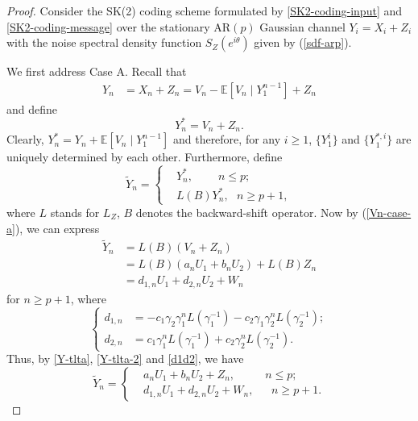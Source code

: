 \documentclass[12pt]{article}
\newcommand{\E}{\mathbb{E}}
\begin{document}
\begin{proof}
Consider the SK(2) coding scheme formulated by \eqref{SK2-coding-input} and \eqref{SK2-coding-message} over the stationary AR$(p)$ Gaussian channel $Y_i = X_i +Z_i$ with the noise spectral density function $S_Z(e^{i\theta})$ given by (\ref{sdf-arp}).

We first address Case A. Recall that 
\begin{equation*}
\begin{aligned}
Y_n &= X_n + Z_n= V_n -\E[V_n\mid Y_1^{n-1}] +Z_n
\end{aligned}
\end{equation*}
and define
\begin{equation*}
Y_n^\ast = V_n + Z_n.
\end{equation*}
Clearly, $Y_n^\ast = Y_n +\E[V_n\mid Y_1^{n-1}]$ and therefore, for any $i\ge 1$, $\{ Y_1^i \}$ and $\{Y_1^{\ast,i}\}$ are uniquely determined by each other. Furthermore, define
\begin{equation}\label{Y-tlta}
\widetilde{Y}_n =\left\{ 
\begin{aligned}
& Y_n^\ast, ~~~~~~~~~~ n\le p;\\[2pt]
&L(B)Y^\ast_n, ~~~n\ge p+1,
\end{aligned}
\right.
\end{equation}
where $L$ stands for $L_Z$, $B$ denotes the backward-shift operator. Now by (\ref{Vn-case-a}), we can express 
\begin{equation}\label{Y-tlta-2}
\begin{aligned}
\widetilde{Y}_n & = L(B)(V_n +Z_n)\\
& =  L(B)(a_n U_1 +b_nU_2) +L(B)Z_n\\
&= d_{1,n}U_1 +d_{2,n}U_2 +W_n
\end{aligned}
\end{equation}
for $n\ge p+1$, where
\begin{equation}\label{d1d2}
\left\{ 
\begin{aligned}
d_{1,n} &=-c_1\gamma_2\gamma_1^nL(\gamma_1^{-1})- c_2\gamma_1\gamma_2^n L(\gamma_2^{-1});\\[2pt]
d_{2,n} &= c_1\gamma_1^nL(\gamma_1^{-1}) + c_2\gamma_2^n L(\gamma_2^{-1}).
\end{aligned}
\right.
\end{equation}
Thus, by \eqref{Y-tlta}, \eqref{Y-tlta-2} and \eqref{d1d2}, we have 
\begin{equation}\label{Y-tlta-re}
\widetilde{Y}_n =\left\{ 
\begin{aligned}
& a_n U_1 +b_n U_2 + Z_n, ~~~~~~~~~~~~ n\le p;\\[2pt]
&d_{1,n}U_1 + d_{2,n}U_2 + W_n,~~~~ ~~~n\ge p+1.
\end{aligned}
\right.
\end{equation}


\end{proof}
\end{document}
